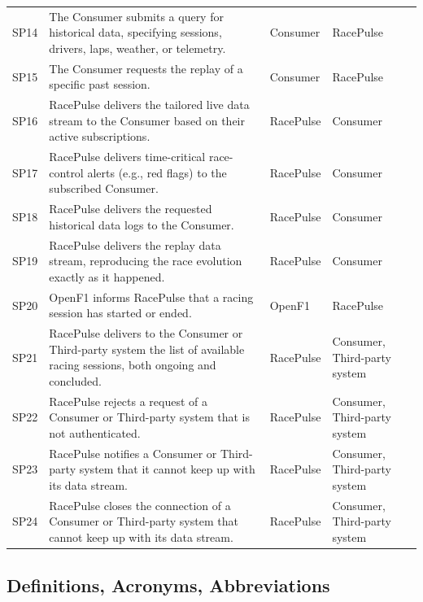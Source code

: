 \documentclass[11pt,a4paper]{article}
\newcommand{\RP}{RacePulse}
\begin{document}
\begin{longtable}{@{}L{1.2cm} L{8.9cm} L{2.1cm} L{2.1cm}@{}}
SP14 & The Consumer submits a query for historical data, specifying sessions, drivers, laps, weather, or telemetry. & Consumer & \RP\\
SP15 & The Consumer requests the replay of a specific past session. & Consumer & \RP\\
\midrule
SP16 & \RP{} delivers the tailored live data stream to the Consumer based on their active subscriptions. & \RP & Consumer\\
SP17 & \RP{} delivers time-critical race-control alerts (e.g., red flags) to the subscribed Consumer. & \RP & Consumer\\
SP18 & \RP{} delivers the requested historical data logs to the Consumer. & \RP & Consumer\\
SP19 & \RP{} delivers the replay data stream, reproducing the race evolution exactly as it happened. & \RP & Consumer\\
\midrule
SP20 & OpenF1 informs \RP{} that a racing session has started or ended. & OpenF1 & \RP\\
SP21 & \RP{} delivers to the Consumer or Third-party system the list of available racing sessions, both ongoing and concluded. & \RP & Consumer, Third-party system\\
SP22 & \RP{} rejects a request of a Consumer or Third-party system that is not authenticated. & \RP & Consumer, Third-party system\\
SP23 & \RP{} notifies a Consumer or Third-party system that it cannot keep up with its data stream. & \RP & Consumer, Third-party system\\
SP24 & \RP{} closes the connection of a Consumer or Third-party system that cannot keep up with its data stream. & \RP & Consumer, Third-party system\\
\end{longtable}
 
\subsection{Definitions, Acronyms, Abbreviations}
 
\end{document}
